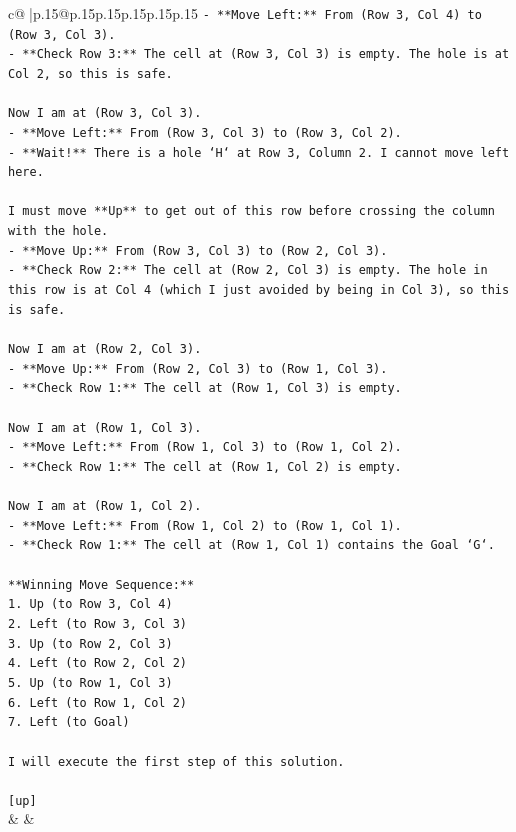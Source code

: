 \documentclass{article}
\begin{document}
{\begin{supertabular}{c@{$\;$}|p{.15\linewidth}@{}p{.15\linewidth}p{.15\linewidth}p{.15\linewidth}p{.15\linewidth}p{.15\linewidth}}
{{{\texttt{{-} **Move Left:** From (Row 3, Col 4) to (Row 3, Col 3).} \\
\texttt{{-} **Check Row 3:** The cell at (Row 3, Col 3) is empty. The hole is at Col 2, so this is safe.} \\
\\ 
\texttt{Now I am at (Row 3, Col 3).} \\
\texttt{{-} **Move Left:** From (Row 3, Col 3) to (Row 3, Col 2).} \\
\texttt{{-} **Wait!** There is a hole `H` at Row 3, Column 2. I cannot move left here.} \\
\\ 
\texttt{I must move **Up** to get out of this row before crossing the column with the hole.} \\
\texttt{{-} **Move Up:** From (Row 3, Col 3) to (Row 2, Col 3).} \\
\texttt{{-} **Check Row 2:** The cell at (Row 2, Col 3) is empty. The hole in this row is at Col 4 (which I just avoided by being in Col 3), so this is safe.} \\
\\ 
\texttt{Now I am at (Row 2, Col 3).} \\
\texttt{{-} **Move Up:** From (Row 2, Col 3) to (Row 1, Col 3).} \\
\texttt{{-} **Check Row 1:** The cell at (Row 1, Col 3) is empty.} \\
\\ 
\texttt{Now I am at (Row 1, Col 3).} \\
\texttt{{-} **Move Left:** From (Row 1, Col 3) to (Row 1, Col 2).} \\
\texttt{{-} **Check Row 1:** The cell at (Row 1, Col 2) is empty.} \\
\\ 
\texttt{Now I am at (Row 1, Col 2).} \\
\texttt{{-} **Move Left:** From (Row 1, Col 2) to (Row 1, Col 1).} \\
\texttt{{-} **Check Row 1:** The cell at (Row 1, Col 1) contains the Goal `G`.} \\
\\ 
\texttt{**Winning Move Sequence:**} \\
\texttt{1. Up (to Row 3, Col 4)} \\
\texttt{2. Left (to Row 3, Col 3)} \\
\texttt{3. Up (to Row 2, Col 3)} \\
\texttt{4. Left (to Row 2, Col 2)} \\
\texttt{5. Up (to Row 1, Col 3)} \\
\texttt{6. Left (to Row 1, Col 2)} \\
\texttt{7. Left (to Goal)} \\
\\ 
\texttt{I will execute the first step of this solution.} \\
\\ 
\texttt{{[}up{]}} \\
            }
        }
    }
    & & \\ \\


\end{supertabular}}
\end{document}

